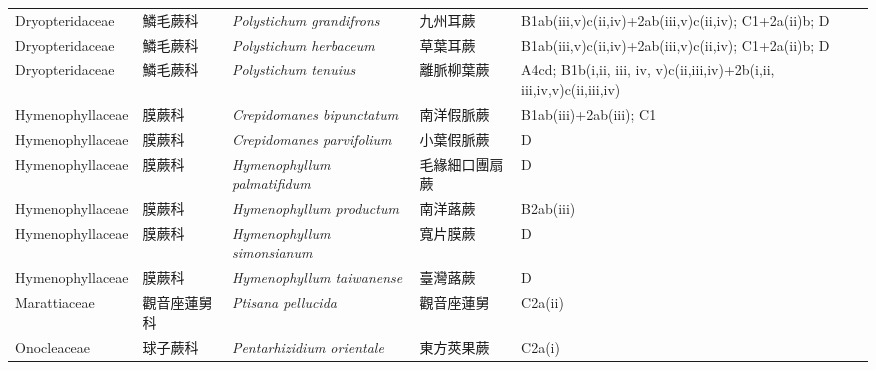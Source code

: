 {\begin{longtable}{p{2.5cm}p{2.5cm}p{4.5cm}p{2.5cm}p{3cm}}
    Dryopteridaceae & 鱗毛蕨科 & \textit{Polystichum grandifrons}  & 九州耳蕨 & B1ab(iii,v)c(ii,iv)+2ab(iii,v)c(ii,iv); C1+2a(ii)b; D \index{Polystichum@\textit{Polystichum}!grandifrons@\textit{grandifrons}}  \index{九州耳蕨} \\
    Dryopteridaceae & 鱗毛蕨科 & \textit{Polystichum herbaceum}  & 草葉耳蕨 & B1ab(iii,v)c(ii,iv)+2ab(iii,v)c(ii,iv); C1+2a(ii)b; D \index{Polystichum@\textit{Polystichum}!herbaceum@\textit{herbaceum}}  \index{草葉耳蕨} \\
    Dryopteridaceae & 鱗毛蕨科 & \textit{Polystichum tenuius}  & 離脈柳葉蕨 & A4cd; B1b(i,ii, iii, iv, v)c(ii,iii,iv)+2b(i,ii, iii,iv,v)c(ii,iii,iv) \index{Polystichum@\textit{Polystichum}!tenuius@\textit{tenuius}}  \index{離脈柳葉蕨} \\
    Hymenophyllaceae & 膜蕨科 & \textit{Crepidomanes bipunctatum}  & 南洋假脈蕨 & B1ab(iii)+2ab(iii); C1 \index{Crepidomanes@\textit{Crepidomanes}!bipunctatum@\textit{bipunctatum}}  \index{南洋假脈蕨} \\
    Hymenophyllaceae & 膜蕨科 & \textit{Crepidomanes parvifolium}  & 小葉假脈蕨 & D \index{Crepidomanes@\textit{Crepidomanes}!parvifolium@\textit{parvifolium}}  \index{小葉假脈蕨} \\
    Hymenophyllaceae & 膜蕨科 & \textit{Hymenophyllum palmatifidum}  & 毛緣細口團扇蕨 & D \index{Hymenophyllum@\textit{Hymenophyllum}!palmatifidum@\textit{palmatifidum}}  \index{毛緣細口團扇蕨} \\
    Hymenophyllaceae & 膜蕨科 & \textit{Hymenophyllum productum}  & 南洋蕗蕨 & B2ab(iii) \index{Hymenophyllum@\textit{Hymenophyllum}!productum@\textit{productum}}  \index{南洋蕗蕨} \\
    Hymenophyllaceae & 膜蕨科 & \textit{Hymenophyllum simonsianum}  & 寬片膜蕨 & D \index{Hymenophyllum@\textit{Hymenophyllum}!simonsianum@\textit{simonsianum}}  \index{寬片膜蕨} \\
    Hymenophyllaceae & 膜蕨科 & \textit{Hymenophyllum taiwanense}  & 臺灣蕗蕨 & D \index{Hymenophyllum@\textit{Hymenophyllum}!taiwanense@\textit{taiwanense}}  \index{臺灣蕗蕨} \\
    Marattiaceae & 觀音座蓮舅科 & \textit{Ptisana pellucida}  & 觀音座蓮舅 & C2a(ii) \index{Ptisana@\textit{Ptisana}!pellucida@\textit{pellucida}}  \index{觀音座蓮舅} \\
    Onocleaceae & 球子蕨科 & \textit{Pentarhizidium orientale}  & 東方莢果蕨 & C2a(i) \index{Pentarhizidium@\textit{Pentarhizidium}!orientale@\textit{orientale}}  \index{東方莢果蕨} \\

\end{longtable}}
